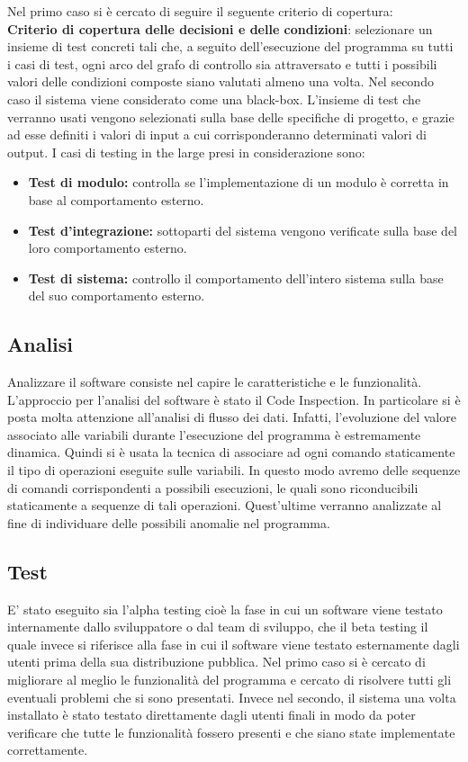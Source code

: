 \documentclass[a4paper,final,12pt]{report}
\begin{document}
Nel primo caso si è cercato di seguire il seguente criterio di copertura:\\
\textbf{Criterio di copertura delle decisioni e delle condizioni}: selezionare un insieme di test concreti tali che, a seguito dell'esecuzione del programma su tutti i casi di test, ogni arco del grafo di controllo sia attraversato e tutti i possibili valori delle condizioni composte siano valutati almeno una volta.
Nel secondo caso il sistema viene considerato come una black-box. L'insieme di test che verranno usati vengono selezionati sulla base delle specifiche di progetto, e grazie ad esse definiti i valori di input a cui corrisponderanno determinati valori di output. 
I casi di testing in the large presi in considerazione sono:
\begin{itemize}
\item \textbf{Test di modulo:} controlla se l'implementazione di un modulo è corretta in base al comportamento esterno.
\item \textbf{Test d'integrazione:} sottoparti del sistema vengono verificate sulla base del loro comportamento esterno.
\item \textbf{Test di sistema:} controllo il comportamento dell'intero sistema sulla  base del suo comportamento esterno. 
\end{itemize}

\subsection{Analisi}
Analizzare il software consiste nel capire le caratteristiche e le funzionalità.
L'approccio per l'analisi del software è stato il Code Inspection. In particolare si è posta molta attenzione all'analisi di flusso dei dati.
Infatti, l'evoluzione del valore associato alle variabili durante l'esecuzione del programma è estremamente dinamica. Quindi si è usata la tecnica di associare ad ogni comando staticamente il tipo di operazioni eseguite sulle variabili. In questo modo avremo delle sequenze di comandi corrispondenti a possibili esecuzioni, le quali sono riconducibili staticamente a sequenze di tali operazioni. Quest'ultime verranno analizzate al fine di individuare delle possibili anomalie nel programma.

\subsection{Test}
E' stato eseguito sia l'alpha testing cioè la fase in cui un software viene testato internamente dallo sviluppatore o dal team di sviluppo, che il beta testing il quale invece si riferisce alla fase in cui il software viene testato esternamente dagli utenti prima della sua distribuzione pubblica. Nel primo caso si è cercato di migliorare al meglio le funzionalità del programma e cercato di risolvere tutti gli eventuali problemi che si sono presentati. Invece nel secondo, il sistema una volta installato è stato testato direttamente dagli utenti finali in modo da poter verificare che tutte le funzionalità fossero presenti e che siano state implementate correttamente.
\end{document}
